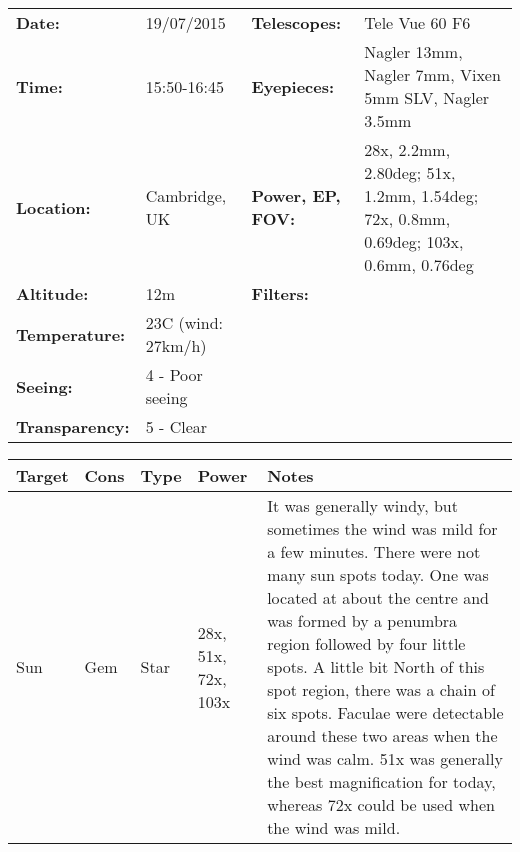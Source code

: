 \begin{tabular}{ p{0.9in} p{1.3in} p{1.2in} p{5.2in}}
{\bf Date:} & 19/07/2015 & {\bf Telescopes:} & Tele Vue 60 F6 \\ 
{\bf Time:} & 15:50-16:45 & {\bf Eyepieces:} & Nagler 13mm, Nagler 7mm, Vixen 5mm SLV, Nagler 3.5mm \\ 
{\bf Location:} & Cambridge, UK & {\bf Power, EP, FOV:} & 28x, 2.2mm, 2.80deg; 51x, 1.2mm, 1.54deg; 72x, 0.8mm, 0.69deg; 103x, 0.6mm, 0.76deg \\ 
{\bf Altitude:} & 12m & {\bf Filters:} &  \\ 
{\bf Temperature:} & 23C (wind: 27km/h) & & \\ 
{\bf Seeing:} & 4 - Poor seeing & & \\ 
{\bf Transparency:} & 5 - Clear & & \\ 
\end{tabular}
\begin{longtable}{ p{0.7in}  p{0.3in}  p{0.6in}  p{0.9in}  p{5.8in} }
\hline 
{\bf Target} & {\bf Cons} & {\bf Type} & {\bf Power} & {\bf Notes} \\ 
\hline 
Sun & Gem & Star & 28x, 51x, 72x, 103x & It was generally windy, but sometimes the wind was mild for a few minutes. There were not many sun spots today. One was located at about the centre and was formed by a penumbra region followed by four little spots. A little bit North of this spot region, there was a chain of six spots. Faculae were detectable around these two areas when the wind was calm. 51x was generally the best magnification for today, whereas 72x could be used when the wind was mild. \\ 
\hline 
\end{longtable} 
